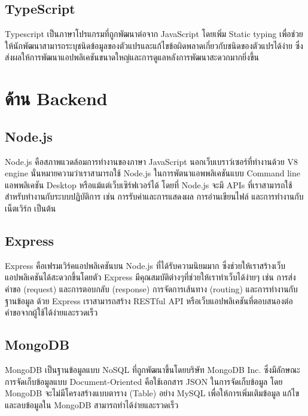 \subsection{TypeScript}
Typescript เป็นภาษาโปรแกรมที่ถูกพัฒนาต่อจาก JavaScript โดยเพิ่ม Static typing เพื่อช่วยให้นักพัฒนาสามารถระบุชนิดข้อมูลของตัวแปรและแก้ไขข้อผิดพลาดเกี่ยวกับชนิดของตัวแปรได้ง่าย ซึ่งส่งผลให้การพัฒนาแอปพลิเคชันขนาดใหญ่และการดูแลหลังการพัฒนาสะดวกมากยิ่งขึ้น \cite{typescript}

\section{ด้าน Backend}
\subsection{Node.js}
Node.js คือสภาพแวดล้อมการทำงานของภาษา JavaScript นอกเว็บเบราว์เซอร์ที่ทำงานด้วย V8 engine นั่นหมายความว่าเราสามารถใช้ Node.js ในการพัตนาแอพพลิเคชันแบบ Command line แอพพลิเคชัน Desktop หรือแม้แต่เว็บเซิร์ฟเวอร์ได้ โดยที่ Node.js จะมี APIs ที่เราสามารถใช้สำหรับทำงานกับระบบปฏิบัติการ เช่น การรับค่าและการแสดงผล การอ่านเขียนไฟล์ และการทำงานกับเน็ตเวิร์ก เป็นต้น
\cite{node}
\subsection{Express}
Express คือเฟรมเวิร์คแอปพลิเคชันบน Node.js ที่ได้รับความนิยมมาก ซึ่งช่วยให้เราสร้างเว็บแอปพลิเคชันได้สะดวกขึ้นโดยตัว Express มีคุณสมบัติต่างๆที่ช่วยให้เราทำเว็บได้ง่ายๆ เช่น การส่งคำขอ (request) และการตอบกลับ (response) การจัดการเส้นทาง (routing) และการทำงานกับฐานข้อมูล ด้วย Express เราสามารถสร้าง RESTful API หรือเว็บแอปพลิเคชันที่ตอบสนองต่อคำขอจากผู้ใช้ได้ง่ายและรวดเร็ว
\cite{express}
\subsection{MongoDB}
MongoDB เป็นฐานข้อมูลแบบ NoSQL ที่ถูกพัฒนาขึ้นโดยบริษัท MongoDB Inc. ซึ่งมีลักษณะการจัดเก็บข้อมูลแบบ Document-Oriented คือใช้เอกสาร JSON ในการจัดเก็บข้อมูล โดย MongoDB จะไม่มีโครงสร้างแบบตาราง (Table) อย่าง MySQL เพื่อให้การเพิ่มเติมข้อมูล แก้ไข และลบข้อมูลใน MongoDB สามารถทำได้ง่ายและรวดเร็ว
\cite{mongo}
